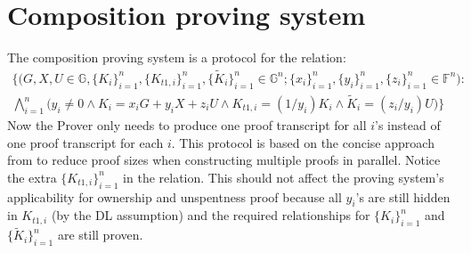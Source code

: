 \documentclass{article}
\begin{document}
\appendix

\section{Composition proving system}\label{comp-prov}
The composition proving system is a protocol for the relation:
\begin{multline*}
\Big\{\big(G, X, U\in\mathbb{G}, \{K_i\}_{i=1}^n, \{K_{t1,i}\}_{i=1}^n, \{\tilde{K}_i\}_{i=1}^n \in\mathbb{G}^n; \{x_i\}_{i=1}^n, \{y_i\}_{i=1}^n, \{z_i\}_{i=1}^n \in\mathbb{F}^n\big): \\ \bigwedge_{i=1}^n{\big(y_i \ne 0 \wedge K_i = x_i G + y_i X + z_i U \wedge K_{t1,i} = (1/y_i)K_i \wedge \tilde{K}_i = (z_i/y_i)U\big)} \Big\}
\end{multline*}
Now the Prover only needs to produce one proof transcript for all $i$'s instead of one proof transcript for each $i$. This protocol is based on the concise approach from \cite{clsag} to reduce proof sizes when constructing multiple proofs in parallel. Notice the extra $\{K_{t1,i}\}_{i=1}^n$ in the relation. This should not affect the proving system's applicability for ownership and unspentness proof because all $y_i$'s are still hidden in $K_{t1,i}$ (by the DL assumption) and the required relationships for $\{K_i\}_{i=1}^n$ and $\{\tilde{K}_i\}_{i=1}^n$ are still proven.
\end{document}

